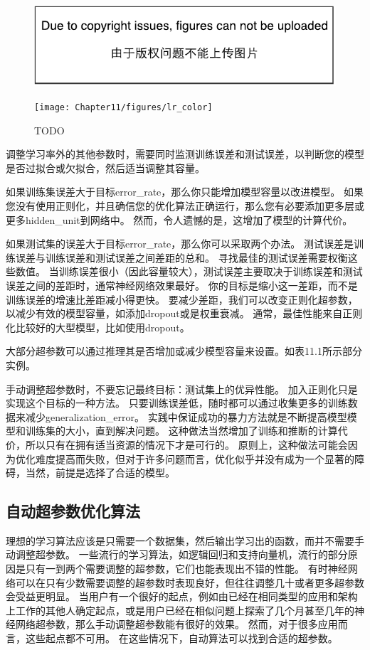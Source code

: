 \begin{figure}[!htb]
\ifOpenSource
\centerline{\includegraphics{figure.pdf}}
\else
\centerline{\texttt{[image: Chapter11/figures/lr\_color]}}
\fi
\caption{TODO}
\label{fig:chap11_lr}
\end{figure}

调整学习率外的其他参数时，需要同时监测训练误差和测试误差，以判断您的模型是否过拟合或欠拟合，然后适当调整其容量。

如果训练集误差大于目标\gls{error_rate}，那么你只能增加模型容量以改进模型。
如果您没有使用正则化，并且确信您的优化算法正确运行，那么您有必要添加更多层或更多\gls{hidden_unit}到网络中。
然而，令人遗憾的是，这增加了模型的计算代价。


如果测试集的误差大于目标\gls{error_rate}，那么你可以采取两个办法。
测试误差是训练误差与训练误差和测试误差之间差距的总和。
寻找最佳的测试误差需要权衡这些数值。
当训练误差很小（因此容量较大），测试误差主要取决于训练误差和测试误差之间的差距时，通常神经网络效果最好。
你的目标是缩小这一差距，而不是训练误差的增速比差距减小得更快。
要减少差距，我们可以改变正则化超参数，以减少有效的模型容量，如添加\gls{dropout}或是权重衰减。
通常，最佳性能来自正则化比较好的大型模型，比如使用\gls{dropout}。

大部分超参数可以通过推理其是否增加或减少模型容量来设置。如表11.1所示部分实例。

手动调整超参数时，不要忘记最终目标：测试集上的优异性能。
加入正则化只是实现这个目标的一种方法。
只要训练误差低，随时都可以通过收集更多的训练数据来减少\gls{generalization_error}。
实践中保证成功的暴力方法就是不断提高模型模型和训练集的大小，直到解决问题。
这种做法当然增加了训练和推断的计算代价，所以只有在拥有适当资源的情况下才是可行的。
原则上，这种做法可能会因为优化难度提高而失败，但对于许多问题而言，优化似乎并没有成为一个显著的障碍，当然，前提是选择了合适的模型。


\subsection{自动超参数优化算法}
\label{sec:automatic_hyperparameter_optimization_algorithms}
理想的学习算法应该是只需要一个数据集，然后输出学习出的函数，而并不需要手动调整超参数。
一些流行的学习算法，如逻辑回归和支持向量机，流行的部分原因是只有一到两个需要调整的超参数，它们也能表现出不错的性能。
有时神经网络可以在只有少数需要调整的超参数时表现良好，但往往调整几十或者更多超参数会受益更明显。
当用户有一个很好的起点，例如由已经在相同类型的应用和架构上工作的其他人确定起点，或是用户已经在相似问题上探索了几个月甚至几年的神经网络超参数，那么手动调整超参数能有很好的效果。
然而，对于很多应用而言，这些起点都不可用。
在这些情况下，自动算法可以找到合适的超参数。

